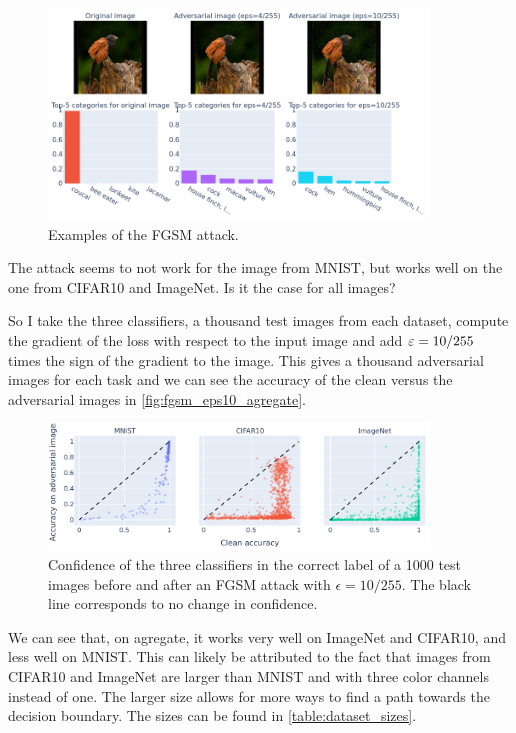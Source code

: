 \documentclass[]{scrarticle}
\begin{document}
\begin{figure}[H]
  \centering
  \includegraphics[width=0.9\textwidth]{images/fgsm_example_ImageNet.png}
  \caption{Examples of the FGSM attack.}
  \label{fig:fgsm_examples_imagenet}
\end{figure}

The attack seems to not work for the image from MNIST, but works well
on the one from CIFAR10 and ImageNet.
Is it the case for all images?

So I take the three classifiers, a thousand test images from each dataset,
compute the gradient of the loss with respect to the input image
and add $\varepsilon = 10 / 255$ times the sign of the gradient to the image.
This gives a thousand adversarial images for each task and
we can see the accuracy of the clean versus the adversarial images
in \autoref{fig:fgsm_eps10_agregate}.

\begin{figure}[H]
  \centering
  \includegraphics[width=0.9\textwidth]{images/fgsm_strength.png}
  \caption{Confidence of the three classifiers in the correct label of
    a 1000 test images before and after an FGSM attack with $\epsilon = 10 / 255$.
    The black line corresponds to no change in confidence.
  }
  \label{fig:fgsm_eps10_agregate}
\end{figure}

We can see that, on agregate, it works very well on ImageNet and CIFAR10,
and less well on MNIST. This can likely be attributed to the fact that
images from CIFAR10 and ImageNet are larger than MNIST and with three
color channels instead of one. The larger size allows for more ways to
find a path towards the decision boundary.
The sizes can be found in \autoref{table:dataset_sizes}.
\end{document}
